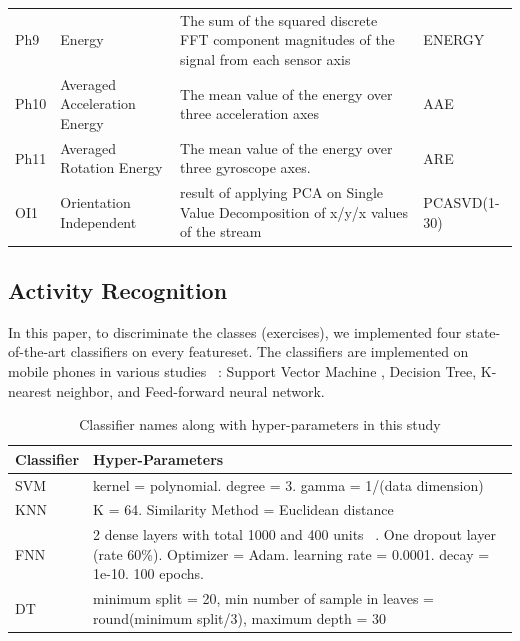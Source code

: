 \documentclass[journal,article,submit,moreauthors,pdftex]{Definitions/mdpi}
\begin{document}
\begin{table}[H]
\begin{tabular}{p{0.9cm}p{5cm}p{7cm}p{1.3cm}}
		Ph9&Energy&{\scriptsize The sum of the squared discrete FFT component magnitudes of the signal from each sensor axis} & ENERGY \\
		Ph10&Averaged Acceleration Energy&{\scriptsize The mean value of the energy over three acceleration axes} & AAE \\
		Ph11&Averaged Rotation Energy&{\scriptsize The mean value of the energy over three gyroscope axes. } & ARE \\
		OI1&Orientation Independent&{\scriptsize result of applying PCA on Single Value Decomposition  of x/y/x values of the stream } & PCASVD(1-30) \\
		\bottomrule
	\end{tabular}
	\label{features_table}
\end{table}

\subsection{Activity Recognition}
\label{method}
In this paper, to discriminate the classes (exercises), we implemented four state-of-the-art classifiers on every featureset. The classifiers are implemented on mobile phones in various studies ~\cite{morris2014recofit,baldominos2019comparison,rosati2018comparison}: Support Vector Machine , Decision Tree, K-nearest neighbor, and Feed-forward neural network. 
\begin{table}[H]
	\caption{Classifier names along with hyper-parameters in this study}
	\centering
	\begin{tabular}{p{2cm}p{7.7cm}}
		\toprule
		\textbf{Classifier} & \textbf{Hyper-Parameters} \\
		\midrule
		SVM &  kernel = polynomial. degree = 3. gamma = 1/(data dimension)  \\
		\midrule
		KNN & K = 64. Similarity Method = Euclidean distance  \\
		\midrule
		FNN & { 2 dense layers with total 1000 and 400 units ~\cite{nair2010rectified}. One dropout layer (rate 60\%). Optimizer = Adam. learning rate = 0.0001. decay = 1e-10. 100 epochs.}\\
		\midrule
		DT & minimum split = 20, min number of sample in leaves = round(minimum split/3), maximum depth = 30 \\
		\bottomrule
	\end{tabular}
	\label{classifier_hyper_parameter}
\end{table}
\end{document}
